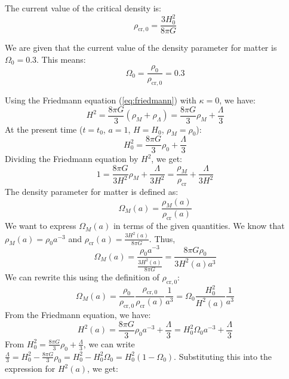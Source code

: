 \documentclass{article}
\begin{document}
The current value of the critical density is:
\begin{equation}
\rho_{\text{cr},0} = \frac{3H_0^2}{8\pi G}
\end{equation}

We are given that the current value of the density parameter for matter is $\Omega_{0} = 0.3$. This means:
\begin{equation}
\Omega_{0} = \frac{\rho_{0}}{\rho_{\text{cr},0}} = 0.3
\end{equation}

Using the Friedmann equation (\ref{eq:friedmann}) with $\kappa = 0$, we have:
\begin{equation}
H^2 = \frac{8\pi G}{3}(\rho_M + \rho_\Lambda) = \frac{8\pi G}{3} \rho_M + \frac{\Lambda}{3}
\end{equation}
At the present time ($t=t_0$, $a=1$, $H=H_0$, $\rho_M = \rho_0$):
\begin{equation}
H_0^2 = \frac{8\pi G}{3} \rho_0 + \frac{\Lambda}{3}
\end{equation}
Dividing the Friedmann equation by $H^2$, we get:
\begin{equation}
1 = \frac{8\pi G}{3H^2} \rho_M + \frac{\Lambda}{3H^2} = \frac{\rho_M}{\rho_{\text{cr}}} + \frac{\Lambda}{3H^2}
\end{equation}
The density parameter for matter is defined as:
\begin{equation}
\Omega_M(a) = \frac{\rho_M(a)}{\rho_{\text{cr}}(a)}
\end{equation}
We want to express $\Omega_M(a)$ in terms of the given quantities. We know that $\rho_M(a) = \rho_0 a^{-3}$ and $\rho_{\text{cr}}(a) = \frac{3H^2(a)}{8\pi G}$. Thus,
\begin{equation}
\Omega_M(a) = \frac{\rho_0 a^{-3}}{\frac{3H^2(a)}{8\pi G}} = \frac{8\pi G \rho_0}{3 H^2(a) a^3}
\end{equation}
We can rewrite this using the definition of $\rho_{\text{cr},0}$:
\begin{equation}
\Omega_M(a) = \frac{\rho_0}{\rho_{\text{cr},0}} \frac{\rho_{\text{cr},0}}{\rho_{\text{cr}}(a)} \frac{1}{a^3} = \Omega_0 \frac{H_0^2}{H^2(a)} \frac{1}{a^3}
\end{equation}
From the Friedmann equation, we have:
\begin{equation}
H^2(a) = \frac{8\pi G}{3} \rho_0 a^{-3} + \frac{\Lambda}{3} = H_0^2 \Omega_0 a^{-3} + \frac{\Lambda}{3}
\end{equation}
From $H_0^2 = \frac{8\pi G}{3} \rho_0 + \frac{\Lambda}{3}$, we can write $\frac{\Lambda}{3} = H_0^2 - \frac{8\pi G}{3} \rho_0 = H_0^2 - H_0^2 \Omega_0 = H_0^2(1-\Omega_0)$. Substituting this into the expression for $H^2(a)$, we get:
\end{document}
